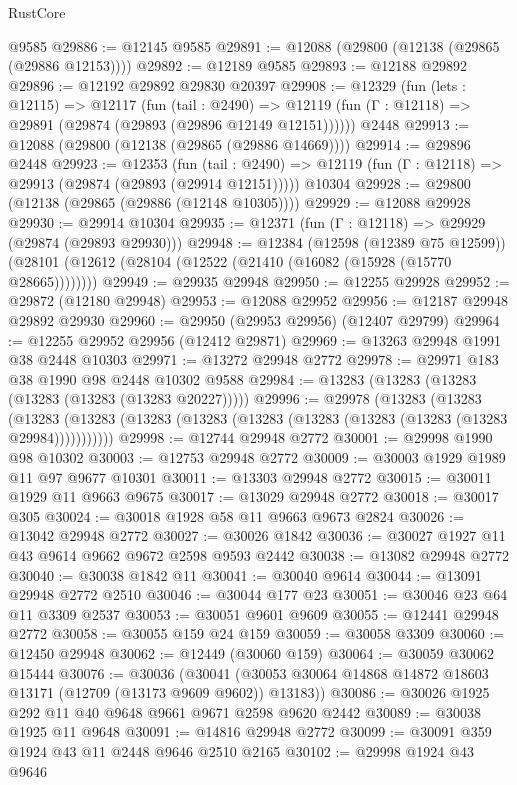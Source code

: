 \begin{lexlean}{RustCore}
\begin{coremodule}
    @9585
@29886 := @12145 @9585
@29891 := @12088 (@29800 (@12138 (@29865 (@29886 @12153))))
@29892 := @12189 @9585
@29893 := @12188 @29892
@29896 := @12192 @29892 @29830 @20397
@29908 := @12329
    (fun (lets : @12115) =>
    @12117
      (fun (tail : @2490) =>
      @12119 (fun (Γ : @12118) => @29891 (@29874 (@29893 (@29896 @12149 @12151))))))
    @2448
@29913 := @12088 (@29800 (@12138 (@29865 (@29886 @14669))))
@29914 := @29896 @2448
@29923 := @12353
    (fun (tail : @2490) => @12119 (fun (Γ : @12118) => @29913 (@29874 (@29893 (@29914 @12151)))))
    @10304
@29928 := @29800 (@12138 (@29865 (@29886 (@12148 @10305))))
@29929 := @12088 @29928
@29930 := @29914 @10304
@29935 := @12371 (fun (Γ : @12118) => @29929 (@29874 (@29893 @29930)))
@29948 := @12384
    (@12598 (@12389 @75 @12599))
    (@28101 (@12612 (@28104 (@12522 (@21410 (@16082 (@15928 (@15770 @28665))))))))
@29949 := @29935 @29948
@29950 := @12255 @29928
@29952 := @29872 (@12180 @29948)
@29953 := @12088 @29952
@29956 := @12187 @29948 @29892 @29930
@29960 := @29950 (@29953 @29956) (@12407 @29799)
@29964 := @12255 @29952 @29956 (@12412 @29871)
@29969 := @13263 @29948 @1991 @38 @2448 @10303
@29971 := @13272 @29948 @2772
@29978 := @29971 @183 @38 @1990 @98 @2448 @10302 @9588
@29984 := @13283 (@13283 (@13283 (@13283 (@13283 (@13283 @20227)))))
@29996 := @29978
    (@13283
      (@13283
        (@13283 (@13283 (@13283 (@13283 (@13283 (@13283 (@13283 (@13283 (@13283 @29984)))))))))))
@29998 := @12744 @29948 @2772
@30001 := @29998 @1990 @98 @10302
@30003 := @12753 @29948 @2772
@30009 := @30003 @1929 @1989 @11 @97 @9677 @10301
@30011 := @13303 @29948 @2772
@30015 := @30011 @1929 @11 @9663 @9675
@30017 := @13029 @29948 @2772
@30018 := @30017 @305
@30024 := @30018 @1928 @58 @11 @9663 @9673 @2824
@30026 := @13042 @29948 @2772
@30027 := @30026 @1842
@30036 := @30027 @1927 @11 @43 @9614 @9662 @9672 @2598 @9593 @2442
@30038 := @13082 @29948 @2772
@30040 := @30038 @1842 @11
@30041 := @30040 @9614
@30044 := @13091 @29948 @2772 @2510
@30046 := @30044 @177 @23
@30051 := @30046 @23 @64 @11 @3309 @2537
@30053 := @30051 @9601 @9609
@30055 := @12441 @29948 @2772
@30058 := @30055 @159 @24 @159
@30059 := @30058 @3309
@30060 := @12450 @29948
@30062 := @12449 (@30060 @159)
@30064 := @30059 @30062 @15444
@30076 := @30036
    (@30041 (@30053 @30064 @14868 @14872 @18603 @13171 (@12709 (@13173 @9609 @9602)) @13183))
@30086 := @30026 @1925 @292 @11 @40 @9648 @9661 @9671 @2598 @9620 @2442
@30089 := @30038 @1925 @11 @9648
@30091 := @14816 @29948 @2772
@30099 := @30091 @359 @1924 @43 @11 @2448 @9646 @2510 @2165
@30102 := @29998 @1924 @43 @9646

\end{coremodule}
\end{lexlean}
